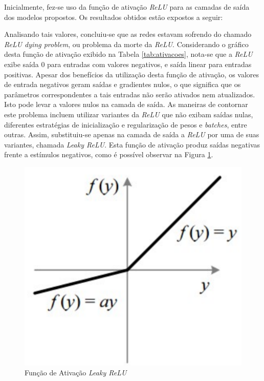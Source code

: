 
Inicialmente, fez-se uso da função de ativação \emph{ReLU} para as camadas de saída dos modelos propostos. Os resultados obtidos estão expostos a seguir:

Analisando tais valores, concluiu-se que as redes estavam sofrendo do chamado \emph{ReLU dying problem}, ou problema da morte da \emph{ReLU}. Considerando o gráfico desta função de ativação exibido na Tabela \ref{tab:ativacoes}, nota-se que a \emph{ReLU} exibe saída $0$ para entradas com valores negativos, e saída linear para entradas positivas.
Apesar dos benefícios da utilização desta função de ativação, os valores de entrada negativos geram saídas e gradientes nulos, o que significa que os parâmetros correspondentes a tais entradas não serão ativados nem atualizados. Isto pode levar a valores nulos na camada de saída. As maneiras de contornar este problema incluem utilizar variantes da \emph{ReLU} que não exibam saídas nulas, diferentes estratégias de inicialização e regularização de pesos e \emph{batches}, entre outras. Assim, substituiu-se apenas na camada de saída a \emph{ReLU} por uma de suas variantes, chamada \emph{Leaky ReLU}. Esta função de ativação produz saídas negativas frente a estímulos negativos, como é possível observar na Figura \ref{fig:lrelu}.

\begin{figure}[h!]
     \includegraphics[widht=0.5]{img/lrelu}
     \caption{Função de Ativação \emph{Leaky ReLU}}
     \label{fig:lrelu}
\end{figure}

